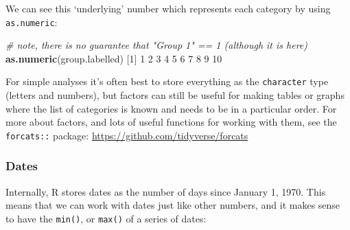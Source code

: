 \documentclass[]{article}
\newenvironment{Shaded}{\begin{snugshade}}{\end{snugshade}}
\newcommand{\CommentTok}[1]{\textcolor[rgb]{0.56,0.35,0.01}{\textit{#1}}}
\newcommand{\DecValTok}[1]{\textcolor[rgb]{0.00,0.00,0.81}{#1}}
\newcommand{\KeywordTok}[1]{\textcolor[rgb]{0.13,0.29,0.53}{\textbf{#1}}}
\newcommand{\NormalTok}[1]{#1}
\newcommand{\OperatorTok}[1]{\textcolor[rgb]{0.81,0.36,0.00}{\textbf{#1}}}
\newcommand{\StringTok}[1]{\textcolor[rgb]{0.31,0.60,0.02}{#1}}
\begin{document}
We can see this `underlying' number which represents each category by using \texttt{as.numeric}:

\begin{Shaded}
\begin{Highlighting}[]
\CommentTok{# note, there is no guarantee that "Group 1" == 1 (although it is here)}
\KeywordTok{as.numeric}\NormalTok{(group.labelled)}
\NormalTok{ [}\DecValTok{1}\NormalTok{]  }\DecValTok{1}  \DecValTok{2}  \DecValTok{3}  \DecValTok{4}  \DecValTok{5}  \DecValTok{6}  \DecValTok{7}  \DecValTok{8}  \DecValTok{9} \DecValTok{10}
\end{Highlighting}
\end{Shaded}

For simple analyses it's often best to store everything as the \texttt{character} type (letters and numbers), but factors can still be useful for making tables or graphs where the list of categories is known and needs to be in a particular order. For more about factors, and lots of useful functions for working with them, see the \texttt{forcats::} package: \url{https://github.com/tidyverse/forcats}

\hypertarget{storingdates}{%
\subsubsection*{Dates}\label{storingdates}}

Internally, R stores dates as the number of days since January 1, 1970. This means that we can work with dates just like other numbers, and it makes sense to have the \texttt{min()}, or \texttt{max()} of a series of dates:

\begin{Shaded}
\end{Shaded}
\end{document}
